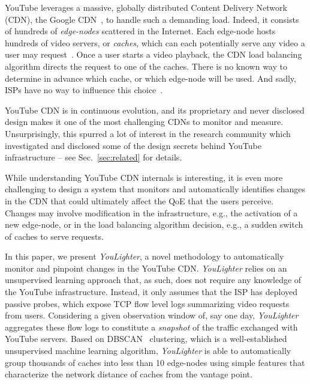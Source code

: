 \documentclass{acm_proc_article-sp}
\newcommand{\tool}{\textit{YouLighter}\xspace}
\newcommand{\node}{{edge-node}\xspace}
\newcommand{\nodes}{{edge-nodes}\xspace}
\begin{document}
YouTube leverages a massive, globally distributed Content Delivery Network (CDN), the Google CDN~\cite{CalderIMC13}, to handle such a demanding load. Indeed, it consists of hundreds of {\it \nodes} scattered in the Internet. Each \node hosts hundreds of video servers, or {\it caches}, which can each potentially serve any video a user may request~\cite{Adhikari2012_infocom}. Once a user starts a video playback, the CDN load balancing algorithm directs the request to one of the caches. There is no known way to determine in advance which cache, or which \node will be used. And sadly, ISPs have no way to influence this choice~\cite{Torres_2011,Cas2014}.

YouTube CDN is in continuous evolution, and its proprietary and never disclosed design makes it one of the most challenging CDNs to monitor and measure. Unsurprisingly, this spurred a lot of interest in the research community which investigated and disclosed some of the design secrets behind YouTube infrastructure -- see Sec.~\ref{sec:related} for details.

While understanding YouTube CDN internals is interesting, it is even more challenging to design a system that monitors and automatically identifies changes in the CDN that could ultimately affect the QoE that the users perceive. Changes may involve modification in the infrastructure, e.g., the activation of a new \node, or in the load balancing algorithm decision, e.g., a sudden switch of caches to serve requests.

In this paper, we present \tool, a novel methodology to automatically monitor and pinpoint changes in the YouTube CDN. \tool relies on an unsupervised learning approach that, as such, does not require any knowledge of the YouTube infrastructure. Instead, it only assumes that the ISP has deployed passive probes, which expose TCP flow level logs summarizing video requests from users.
Considering a given observation window of, say one day, \tool aggregates these flow logs to constitute a {\it snapshot} of the traffic exchanged with YouTube servers.
Based on DBSCAN~\cite{ester1996density} clustering, which is a well-established unsupervised machine learning algorithm, \tool is able to automatically group thousands of caches into less than 10 \nodes using simple features that characterize the network distance of caches from the vantage point.
\end{document}
